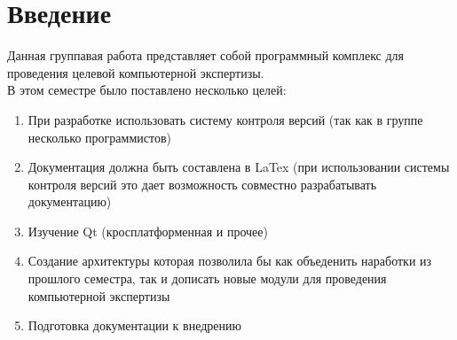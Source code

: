 \newpage

\chapter*{Введение}

Данная группавая работа представляет собой программный комплекс для проведения целевой компьютерной экспертизы. \\
В этом семестре было поставлено несколько целей: \\

\begin{enumerate}
\item При разработке использовать систему контроля версий (так как в группе несколько программистов)
\item Документация должна быть составлена в LaTex (при использовании системы контроля версий это дает возможность совместно разрабатывать документацию)
\item Изучение Qt (кросплатформенная и прочее)
\item Создание архитектуры которая позволила бы как объеденить наработки из прошлого семестра, так и дописать новые модули для проведения компьютерной экспертизы
\item Подготовка документации к внедрению
\end{enumerate}